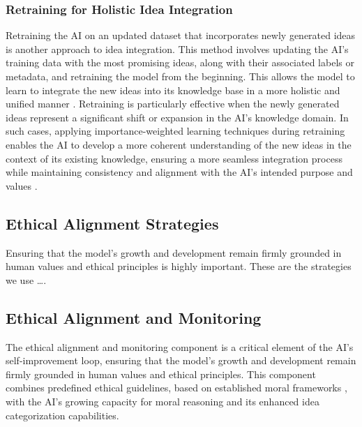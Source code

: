 \documentclass[conference]{article}
\begin{document}
	\subsubsection{Retraining for Holistic Idea Integration}
	Retraining the AI on an updated dataset that incorporates newly generated ideas is another approach to idea integration. This method involves updating the AI's training data with the most promising ideas, along with their associated labels or metadata, and retraining the model from the beginning. This allows the model to learn to integrate the new ideas into its knowledge base in a more holistic and unified manner \cite{mcclelland1995there, parisi2019continual}. Retraining is particularly effective when the newly generated ideas represent a significant shift or expansion in the AI's knowledge domain. In such cases, applying importance-weighted learning techniques during retraining enables the AI to develop a more coherent understanding of the new ideas in the context of its existing knowledge, ensuring a more seamless integration process while maintaining consistency and alignment with the AI's intended purpose and values \cite{chen2018lifelong, sun2020lamol}.
	
	\subsection{Ethical Alignment Strategies}
	
	Ensuring that the model's growth and development remain firmly grounded in human values and ethical principles is highly important. These are the strategies we use \dots.
	
	
	\subsection{Ethical Alignment and Monitoring}
	
	The ethical alignment and monitoring component is a critical element of the AI's self-improvement loop, ensuring that the model's growth and development remain firmly grounded in human values and ethical principles. This component combines predefined ethical guidelines, based on established moral frameworks \cite{mill1863utilitarianism, kant1785groundwork, aristotle1999nicomachean}, with the AI's growing capacity for moral reasoning and its enhanced idea categorization capabilities.
	
\end{document}
